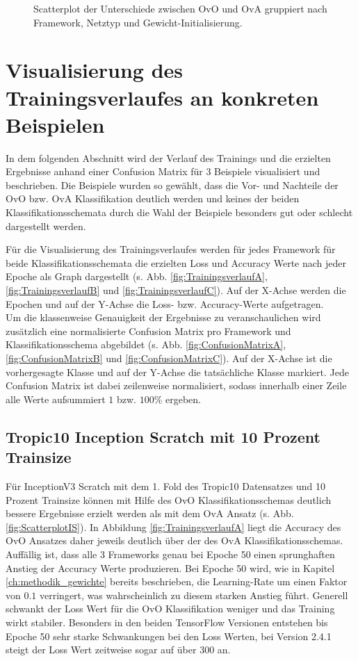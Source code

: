 \begin{figure}[H]
\begin{adjustbox}{width=1.4\textwidth, center}

\end{adjustbox}
\caption{Scatterplot der Unterschiede zwischen OvO und OvA gruppiert nach Framework, Netztyp und Gewicht-Initialisierung.}
\label{fig:ScatterplotGesamt}
\end{figure}
\newpage
\section{Visualisierung des Trainingsverlaufes an konkreten Beispielen}
\label{ch:Beispiele}
In dem folgenden Abschnitt wird der Verlauf des Trainings und die erzielten Ergebnisse anhand einer Confusion Matrix für 3 Beispiele visualisiert und beschrieben. Die Beispiele wurden so gewählt, dass die Vor- und Nachteile der OvO bzw. OvA Klassifikation deutlich werden und keines der beiden Klassifikationsschemata durch die Wahl der Beispiele besonders gut oder schlecht dargestellt werden.

Für die Visualisierung des Trainingsverlaufes werden für jedes Framework für beide Klassifikationsschemata die erzielten Loss und Accuracy Werte nach jeder Epoche als Graph dargestellt (s. Abb. \ref{fig:TrainingsverlaufA}, \ref{fig:TrainingsverlaufB} und \ref{fig:TrainingsverlaufC}). Auf der X-Achse werden die Epochen und auf der Y-Achse die Loss- bzw. Accuracy-Werte aufgetragen.\\

Um die klassenweise Genauigkeit der Ergebnisse zu veranschaulichen wird zusätzlich eine normalisierte Confusion Matrix pro Framework und Klassifikationsschema abgebildet (s. Abb. \ref{fig:ConfusionMatrixA}, \ref{fig:ConfusionMatrixB} und \ref{fig:ConfusionMatrixC}). Auf der X-Achse ist die vorhergesagte Klasse und auf der Y-Achse die tatsächliche Klasse markiert. Jede Confusion Matrix ist dabei zeilenweise normalisiert, sodass innerhalb einer Zeile alle Werte aufsummiert $1$ bzw. $100\%$  ergeben.
\subsection{Tropic10 Inception Scratch mit 10 Prozent Trainsize}
\label{ch:BeispielA}
Für InceptionV3 Scratch mit dem 1. Fold des Tropic10 Datensatzes und 10 Prozent Trainsize können mit Hilfe des OvO Klassifikationsschemas deutlich bessere Ergebnisse erzielt werden als mit dem OvA Ansatz (s. Abb. \ref{fig:ScatterplotIS}).
In Abbildung \ref{fig:TrainingsverlaufA} liegt die Accuracy des OvO Ansatzes daher jeweils deutlich über der des OvA Klassifikationsschemas. Auffällig ist, dass alle 3 Frameworks genau bei Epoche 50 einen sprunghaften Anstieg der Accuracy Werte produzieren. Bei Epoche 50 wird, wie in Kapitel \ref{ch:methodik_gewichte} bereits beschrieben, die Learning-Rate um einen Faktor von $0.1$ verringert, was wahrscheinlich zu diesem starken Anstieg führt. Generell schwankt der Loss Wert für die OvO Klassifikation weniger und das Training wirkt stabiler. Besonders in den beiden TensorFlow \cite{tensorflow} Versionen entstehen bis Epoche 50 sehr starke Schwankungen bei den Loss Werten, bei Version 2.4.1 steigt der Loss Wert zeitweise sogar auf über 300 an.

